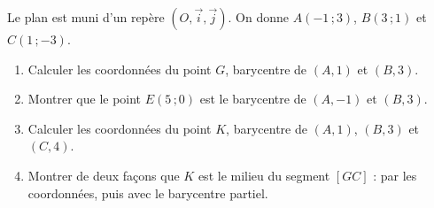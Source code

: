
\newcommand{\R}{\mathbb{R}}
\newcommand{\vect}[1]{\overrightarrow{#1}}

Le plan est muni d'un repère $(O,\vec i,\vec j)$. On donne $A(-1\,;3)$, $B(3\,;1)$ et $C(1\,;-3)$.
\begin{enumerate}
  \item Calculer les coordonnées du point $G$, barycentre de $(A,1)$ et $(B,3)$.
  \item Montrer que le point $E(5\,;0)$ est le barycentre de $(A,-1)$ et $(B,3)$.
  \item Calculer les coordonnées du point $K$, barycentre de $(A,1)$, $(B,3)$ et $(C,4)$.
  \item Montrer de deux façons que $K$ est le milieu du segment $[GC]$ : par les coordonnées, puis avec le barycentre partiel.
\end{enumerate}

